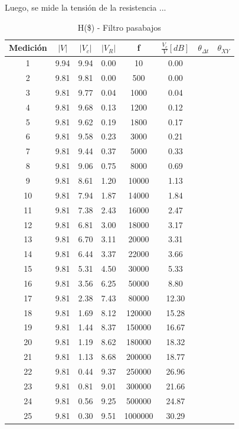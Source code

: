 \documentclass[a4paper]{article}
\begin{document}

Luego, se mide la tensión de la resistencia ...

 \begin{center}
     \begin{table}[H]
     \centering
     \renewcommand{\arraystretch}{1.1}
     \label{table:Filtro pasabajos}
         \begin{tabular}{ c c c c c c c c }
            \hline 
             Medici\'on &  $|V|$ & $|V_c|$& $|V_R|$ & f & $\frac{V_c}{V}[dB]$ & $\theta_{\Delta t}$  &  $\theta_{XY}$\\
             \hline
                1&	9.94&	9.94&	0.00&	10&		0.00& &\\
				2&	9.81&	9.81&	0.00&	500&	0.00& &\\
				3&	9.81&	9.77&	0.04&	1000&	0.04& &\\
				4&	9.81&	9.68&	0.13&	1200&	0.12& &\\
				5&	9.81&	9.62&	0.19&	1800&	0.17& &\\
				6&	9.81&	9.58&	0.23&	3000&	0.21& &\\
				7&	9.81&	9.44&	0.37&	5000&	0.33& &\\
				8&	9.81&	9.06&	0.75&	8000&	0.69& &\\
				9&	9.81&	8.61&	1.20&	10000&	1.13& &\\
				10&	9.81&	7.94&	1.87&	14000&	1.84& &\\
				11&	9.81&	7.38&	2.43&	16000&	2.47& &\\
				12&	9.81&	6.81&	3.00&	18000&	3.17& &\\
				13&	9.81&	6.70&	3.11&	20000&	3.31& &\\
				14&	9.81&	6.44&	3.37&	22000&	3.66& &\\
				15&	9.81&	5.31&	4.50&	30000&	5.33& &\\
				16&	9.81&	3.56&	6.25&	50000&	8.80& &\\
				17&	9.81&	2.38&	7.43&	80000&	12.30& &\\
				18&	9.81&	1.69&	8.12&	120000&	15.28& &\\
				19&	9.81&	1.44&	8.37&	150000&	16.67& &\\
				20&	9.81&	1.19&	8.62&	180000&	18.32& &\\
				21&	9.81&	1.13&	8.68&	200000&	18.77& &\\
				22&	9.81&	0.44&	9.37&	250000&	26.96& &\\
				23&	9.81&	0.81&	9.01&	300000&	21.66& &\\
				24&	9.81&	0.56&	9.25&	500000&	24.87& &\\
				25&	9.81&	0.30&	9.51&	1000000&	30.29& &\\

            \hline 
        \end{tabular}
        \caption{H(\$) - Filtro pasabajos}
    \end{table}
\end{center}
\end{document}
